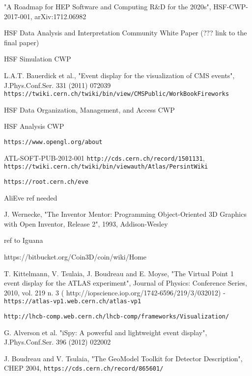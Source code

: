 \documentclass[12pt,a4paper]{article}
\begin{document}
\begin{thebibliography}{999}

 "A Roadmap for HEP Software and Computing R\&D for the 2020s", HSF-CWP-2017-001, arXiv:1712.06982

 HSF Data Analysis and Interpretation Community White Paper (??? link to the final paper)

 HSF Simulation CWP

 L.A.T. Bauerdick et al., "Event display for the visualization of CMS events", J.Phys.Conf.Ser. 331 (2011) 072039
  {\tt https://twiki.cern.ch/twiki/bin/view/CMSPublic/WorkBookFireworks}

 HSF Data Organization, Management, and Access CWP

 HSF Analysis CWP

 {\tt https://www.opengl.org/about}

 ATL-SOFT-PUB-2012-001 {\tt http://cds.cern.ch/record/1501131},
{\tt https://twiki.cern.ch/twiki/bin/viewauth/Atlas/PersintWiki}

 {\tt https://root.cern.ch/eve}

 AliEve ref needed

 J. Wernecke, "The  Inventor Mentor: Programming Object-Oriented 3D Graphics with Open Inventor, Release 2", 1993, Addison-Wesley

 ref to Iguana

 https://bitbucket.org/Coin3D/coin/wiki/Home

 T. Kittelmann, V. Tsulaia, J. Boudreau and E. Moyse, "The Virtual Point 1 event display for the ATLAS experiment", Journal of Physics: Conference Series, 2010, vol. 219 n. 3 ( http://iopscience.iop.org/1742-6596/219/3/032012) -
{\tt https://atlas-vp1.web.cern.ch/atlas-vp1}

 {\tt http://lhcb-comp.web.cern.ch/lhcb-comp/frameworks/Visualization/}

 G. Alverson et al. "iSpy: A powerful and lightweight event display", J.Phys.Conf.Ser. 396 (2012) 022002

 J. Boudreau and V. Tsulaia, "The GeoModel Toolkit for Detector Description", CHEP 2004, {\tt https://cds.cern.ch/record/865601/}


\end{thebibliography}
\end{document}
